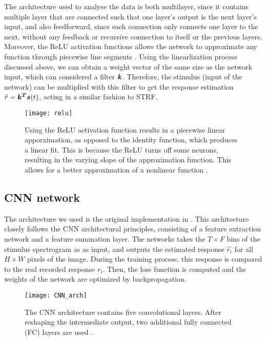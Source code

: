 The architecture used to analyse the data is both multilayer, since it contains multiple layer that are connected such that one layer's output is the next layer's input, and also feedforward, since each connection only connects one layer to the next, without any feedback or recursive connection to itself or the previous layers. Moreover, the ReLU activation functions allows the network to approximate any function through piecewise line segments \parencite{keshishianEstimatingInterpretingNonlinear2020}. Using the linearlization process discussed above, we can obtain a weight vector of the same size as the network input, which can considered a filter $\bm{k}$. Therefore, the stimulus (input of the network) can be multiplied with this filter to get the response estimation $\hat{r} = \bm{k^T}\bm{s}(t)$, acting in a similar fashion to STRF.

\begin{figure}[ht]
	\centering
	\texttt{[image: relu]}
	\caption{Using the ReLU activation function results in a piecewise linear apporximation, as opposed to the identity function, which produces a linear fit. This is because the ReLU turns off some neurons, resulting in the varying slope of the approximation function. This allows for a better approximation of a nonlinear function \parencite{keshishianEstimatingInterpretingNonlinear2020}.}
	\label{fig:piecewise}
\end{figure}

\subsection{CNN network}
The architecture we used is the original implementation in \parencite{keshishianEstimatingInterpretingNonlinear2020}. This architecture closely follows the CNN architectural principles, consisting of a feature extraction network and a feature summation layer. The networks takes the $T \times F$ bins of the stimulus spectrogram as as input, and outputs the estimated response $\hat{r_i}$ for all $H \times W$ pixels of the image. During the training process, this response is compared to the real recorded response $r_i$. Then, the loss function is computed and the weights of the network are optimized by backpropagation.

\begin{figure}[ht]
	\centering
	\texttt{[image: CNN\_arch]}
	\caption{The CNN architecture contains five convolutional layers. After reshaping the intermediate output, two additional fully connected (FC) layers are used \parencite{keshishianEstimatingInterpretingNonlinear2020}.}
\end{figure}

